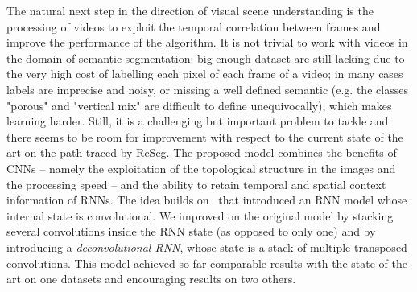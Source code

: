 The natural next step in the direction of visual scene understanding is the
processing of videos to exploit the temporal correlation between frames and
improve the performance of the algorithm. It is not trivial to work with videos
in the domain of semantic segmentation: big enough dataset are still lacking
due to the very high cost of labelling each pixel of each frame of a video; in
many cases labels are imprecise and noisy, or missing a well defined semantic
(e.g. the classes "porous" and "vertical mix" are difficult to define
unequivocally), which makes learning harder. Still, it is a challenging but
important problem to tackle and there seems to be room for improvement with
respect to the current state of the art on the path traced by ReSeg. The
proposed model combines the benefits of CNNs -- namely the exploitation of the
topological structure in the images and the processing speed -- and the ability
to retain temporal and spatial context information of RNNs. The idea builds
on~\cite{ xingjian2015convolutional} that introduced an RNN model whose
internal state is convolutional. We improved on the original model by stacking
several convolutions inside the RNN state (as opposed to only one) and by
introducing a \emph{deconvolutional RNN}, whose state is a stack of multiple
transposed convolutions. This model achieved so far comparable results with the
state-of-the-art on one datasets and encouraging results on two others.


